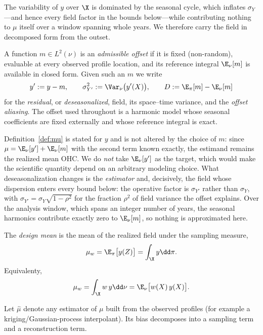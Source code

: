 The variability of $y$ over $\X$ is dominated by the seasonal cycle,
which inflates $\sigma_Y$---and hence every field factor in the bounds
below---while contributing nothing to $\mu$ itself over a window spanning
whole years. We therefore carry the field in decomposed form from the
outset.

\begin{definition}
\label{def:offset}
A function $m\in L^2(\nu)$ is an \emph{admissible offset} if it is fixed
(non-random), evaluable at every observed profile location, and its
reference integral $\E_\nu[m]$ is available in closed form. Given such an
$m$ we write
\[
  y' := y-m,\qquad
  \sigma_{Y'}^2 := \Var_\nu\big(y'(X)\big),\qquad
  D := \E_\pi[m]-\E_\nu[m]
\]
for the \emph{residual}, or \emph{deseasonalized}, field, its space--time
variance, and the \emph{offset aliasing}. The offset used throughout is
a harmonic model whose seasonal coefficients are fixed externally and
whose reference integral is exact.
\end{definition}

\begin{remark}
\label{rem:estimand-invariance}
Definition~\ref{def:mu} is stated for $y$ and is not altered by the
choice of $m$: since $\mu=\E_\nu[y']+\E_\nu[m]$ with the second term
known exactly, the estimand remains the realized mean OHC. We do
\emph{not} take $\E_\nu[y']$ as the target, which would make the
scientific quantity depend on an arbitrary modeling choice. What
deseasonalization changes is the \emph{estimator}
and, decisively, the field whose dispersion
enters every bound below: the operative factor is $\sigma_{Y'}$ rather
than $\sigma_Y$, with $\sigma_{Y'}=\sigma_Y\sqrt{1-\rho^2}$ for the
fraction $\rho^2$ of field variance the offset explains.
Over the analysis window, which spans an
integer number of years, the seasonal harmonics contribute exactly zero
to $\E_\nu[m]$, so nothing is
approximated here.
\end{remark}

\begin{definition}
\label{def:mu-w}
The \emph{design mean} is the mean of the realized field under the sampling measure,
\[
  \mu_w = \E_\pi\big[y(Z)\big] = \int_\X y \dd\pi.
\]
Equivalenty,
\[
  \mu_w = \int_\X w\,y \dd\nu = \E_\nu\big[w(X)\,y(X)\big].
\]

\end{definition}

Let $\hat\mu$ denote any estimator of $\mu$ built from the observed profiles (for example a kriging/Gaussian-process interpolant).
Its bias decomposes into a sampling term and a reconstruction term.


